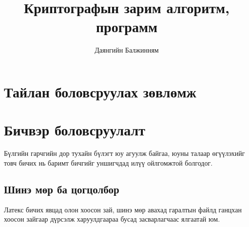 \documentclass[12pt,A4]{report}
\begin{document}

\title{Криптографын зарим алгоритм, программ}
\author{Даянгийн Балжинням}







\chapter{Тайлан боловсруулах зөвлөмж}


\chapter{Бичвэр боловсруулалт}
Бүлгийн гарчгийн дор тухайн бүлэгт юу агуулж байгаа, юуны талаар өгүүлэхийг товч бичих нь баримт бичгийг уншигчдад илүү ойлгомжтой болгодог.
\section{Шинэ мөр ба цогцолбор}
Латекс бичих явцад олон хоосон зай, шинэ мөр авахад гаралтын файлд ганцхан хоосон зайгаар дүрсэлж харуулдгаараа бусад засварлагчаас ялгаатай юм.
\end{document}
